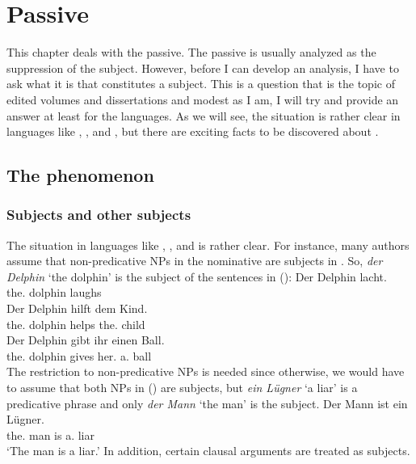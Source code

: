 \chapter{Passive}
\label{chap-case}


This chapter deals with the passive. The passive is usually analyzed as the suppression of the
subject. However, before I can develop an analysis, I have to ask what it is that constitutes a
subject. This is a question that is the topic of edited volumes and dissertations and modest as I
am, I will try and provide an answer at least for the  languages. As we will see, the
situation is rather clear in languages like , , and , but there are exciting
facts to be discovered about . 


\section{The phenomenon}


\subsection{Subjects and other subjects}
\label{sec-subj-properties}
\label{sec-icelandic-quirky-subj}

The situation in languages like , , and  is rather clear. For instance, many
authors assume that non-predicative NPs in the nominative are subjects in . So, \emph{der
  Delphin} `the dolphin' is the subject of the sentences in (): 
\eal
\ex 
\gll Der Delphin lacht.\\
     the.\NOM{} dolphin laughs\\\german
\ex 
\gll Der Delphin hilft dem Kind.\\
     the.\NOM{} dolphin helps the.\DAT{} child\\
\ex 
\gll Der Delphin gibt  ihr einen Ball.\\
     the.\NOM{} dolphin gives her.\DAT{} a.\ACC{} ball\\
\zl
The restriction to non-predicative NPs is needed since otherwise, we would have to assume that both
NPs in () are subjects, but \emph{ein Lügner} `a liar' is a predicative phrase and only
\emph{der Mann} `the man' is the subject.
\ea
\gll Der Mann ist ein Lügner.\\
     the.\NOM{} man is a.\NOM{} liar\\\german
\glt `The man is a liar.'
\z
In addition, certain clausal arguments are treated as subjects.

